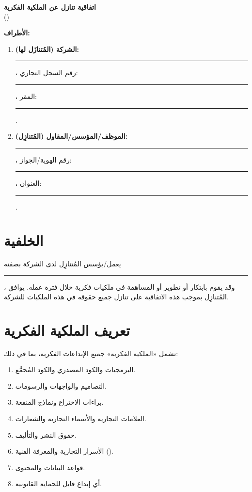 \documentclass[12pt,a4paper]{article}
\begin{document}
\begin{center}
{\LARGE\bfseries اتفاقية تنازل عن الملكية الفكرية}\\[0.5em]
{\large ()}\\[1em]
\end{center}

\vspace{1em}

\noindent\textbf{الأطراف:}

\begin{enumerate}
    \item \textbf{الشركة (المُتنازَل لها):} \rule{8cm}{0.4pt}، رقم السجل التجاري: \rule{4cm}{0.4pt}، المقر: \rule{6cm}{0.4pt}.

    \item \textbf{الموظف/المؤسس/المقاول (المُتنازِل):} \rule{8cm}{0.4pt}، رقم الهوية/الجواز: \rule{4cm}{0.4pt}، العنوان: \rule{6cm}{0.4pt}.
\end{enumerate}

\vspace{1em}

\section{الخلفية}
\label{sec:background}
يعمل/يؤسس المُتنازِل لدى الشركة بصفته \rule{6cm}{0.4pt}، وقد يقوم بابتكار أو تطوير أو المساهمة في ملكيات فكرية خلال فترة عمله. يوافق المُتنازِل بموجب هذه الاتفاقية على تنازل جميع حقوقه في هذه الملكيات للشركة.

\section{تعريف الملكية الفكرية}
\label{sec:definition}
تشمل «الملكية الفكرية» جميع الإبداعات الفكرية، بما في ذلك:
\begin{enumerate}
    \item البرمجيات والكود المصدري والكود المُجمَّع.
    \item التصاميم والواجهات والرسومات.
    \item براءات الاختراع ونماذج المنفعة.
    \item العلامات التجارية والأسماء التجارية والشعارات.
    \item حقوق النشر والتأليف.
    \item الأسرار التجارية والمعرفة الفنية ().
    \item قواعد البيانات والمحتوى.
    \item أي إبداع قابل للحماية القانونية.
\end{enumerate}
\end{document}
